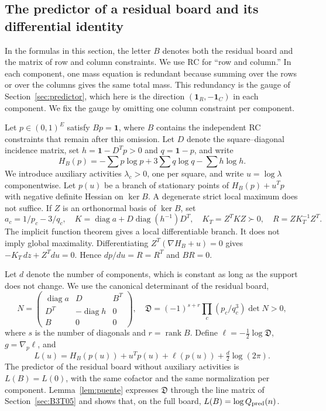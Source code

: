 \subsection{The predictor of a residual board and its differential identity}\label{sec:B3T01}
In the formulas in this section, the letter $B$ denotes both the residual board and the matrix of row and
column constraints. We use RC for “row and column.” In each component, one mass equation is redundant
because summing over the rows or over the columns gives the same total mass. This redundancy is the gauge of
Section~\ref{sec:predictor}, which here is the direction $(\mathbf1_R,-\mathbf1_C)$ in each component. We
fix the gauge by omitting one column constraint per component.

Let $p\in(0,1)^E$ satisfy $Bp=\mathbf1$, where $B$ contains the independent RC constraints that remain after
this omission. Let $D$ denote the square--diagonal incidence matrix, set $h=\mathbf1-D^Tp>0$ and
$q=\mathbf1-p$, and write
\[
 H_B(p)=-\sum p\log p+3\sum q\log q-\sum h\log h.
\]
We introduce auxiliary activities $\lambda_c>0$, one per square, and write $u=\log\lambda$ componentwise.
Let $p(u)$ be a branch of stationary points of $H_B(p)+u^Tp$ with negative definite Hessian on $\ker B$. A
degenerate strict local maximum does not suffice. If $Z$ is an orthonormal basis of $\ker B$, set
\[
 a_c=1/p_c-3/q_c,\quad
 K=\operatorname{diag}a+D\operatorname{diag}(h^{-1})D^T,\quad
 K_T=Z^TKZ\succ0,\quad R=ZK_T^{-1}Z^T.
\]
The implicit function theorem gives a local differentiable branch. It does not imply global maximality.
Differentiating $Z^T(\nabla H_B+u)=0$ gives $-K_T\,dz+Z^Tdu=0$.
Hence $dp/du=R=R^T$ and $BR=0$.

Let $d$ denote the number of components, which is constant as long as the support does not change.
We use the canonical determinant of the residual board,
\[
 N=\begin{pmatrix}
 \operatorname{diag}a&D&B^T\\ D^T&-\operatorname{diag}h&0\\ B&0&0
 \end{pmatrix},\quad
 \mathfrak D=(-1)^{s+r}\prod_c(p_c/q_c^3)\det N>0,
\]
where $s$ is the number of diagonals and $r=\operatorname{rank}B$.
Define $\ell=-\tfrac12\log\mathfrak D$, $g=\nabla_p\ell$, and
\[
 L(u)=H_B(p(u))+u^Tp(u)+\ell(p(u))+\tfrac d2\log(2\pi).
\]
The predictor of the residual board without auxiliary activities is $L(B)=L(0)$, with the same cofactor and
the same normalization per component.
Lemma~\ref{lem:puente} expresses $\mathfrak D$ through the line matrix of Section~\ref{sec:B3T05} and shows
that, on
the full board, $L(B)=\log Q_{\rm pred}(n)$.
